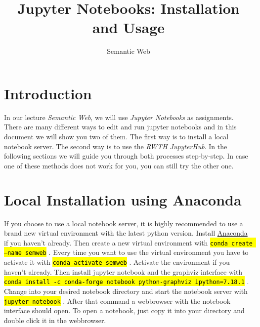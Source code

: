 \documentclass{article}
\title{Jupyter Notebooks: Installation and Usage}
\author{Semantic Web}
\newcommand{\consolecommand}[1]{
\begingroup%
  \sethlcolor{cmd}%
  \hl{\texttt{#1}}%
\endgroup}
\begin{document}
	\maketitle
	\section{Introduction}
	In our lecture \emph{Semantic Web}, we will use \emph{Jupyter Notebooks} as assignments. There are many different ways to edit and run jupyter notebooks and in this document we will show you two of them. The first way is to install a local notebook server. The second way is to use the \emph{RWTH JupyterHub}. In the following sections we will guide you through both processes step-by-step. In case one of these methods does not work for you, you can still try the other one.
	

	\section{Local Installation using Anaconda}
	If you choose to use a local notebook server, it is highly recommended to use a brand new virtual environment with the latest python version.
	Install \href{https://www.anaconda.com/products/individual#Downloads}{Anaconda} if you haven't already. Then create a new virtual environment with \consolecommand{conda create --name semweb}. Every time you want to use the virtual environment you have to activate it with \consolecommand{conda activate semweb}. Activate the environment if you haven't already. Then install jupyter notebook and the graphviz interface with \consolecommand{conda install -c conda-forge notebook python-graphviz ipython=7.18.1}. Change into your desired notebook directory and start the notebook server with \consolecommand{jupyter notebook}. After that command a webbrowser with the notebook interface should open. To open a notebook, just copy it into your directory and double click it in the webbrowser.
\end{document}
